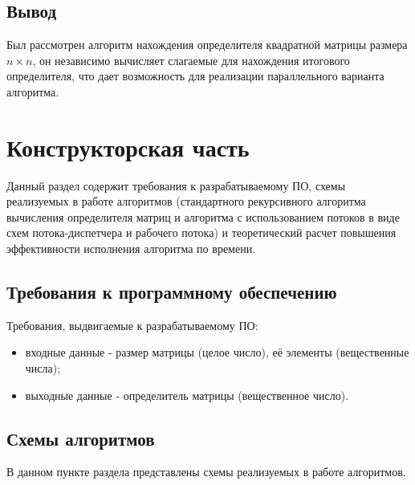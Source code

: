 \documentclass[a4paper,oneside,14pt]{extreport}
\begin{document}
\section{Вывод}
Был рассмотрен алгоритм нахождения определителя квадратной матрицы размера $n \times n$, он независимо вычисляет слагаемые
для нахождения итогового определителя, что дает возможность для реализации параллельного варианта алгоритма.
\newpage

\chapter{Конструкторская часть}
Данный раздел содержит требования к разрабатываемому ПО, схемы реализуемых в работе алгоритмов (стандартного рекурсивного алгоритма вычисления определителя матриц и алгоритма с использованием потоков в виде схем потока-диспетчера и рабочего потока) и теоретический расчет повышения эффективности исполнения алгоритма по времени.

\section{Требования к программному обеспечению}
Требования, выдвигаемые к разрабатываемому ПО:
\begin{itemize}
	\item входные данные - размер матрицы (целое число), её элементы (вещественные числа);
	\item выходные данные - определитель матрицы (вещественное число).
\end{itemize}

\section{Схемы алгоритмов}
В данном пункте раздела представлены схемы реализуемых в работе алгоритмов.
\end{document}
